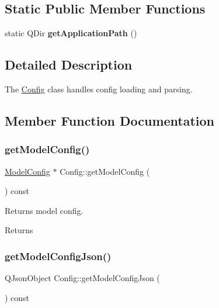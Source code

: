 \subsection*{Static Public Member Functions}
\begin{DoxyCompactItemize}
\item 
\mbox{\label{class_config_ad1d88d5265d60c785c30d69db00c5b9a}} 
static Q\+Dir {\bfseries get\+Application\+Path} ()
\end{DoxyCompactItemize}


\subsection{Detailed Description}
The \mbox{\hyperlink{class_config}{Config}} class handles config loading and parsing. 

\subsection{Member Function Documentation}
\mbox{\label{class_config_a1ff780b4fbdf6f7e432e11f2490c1b56}} 
\subsubsection{\texorpdfstring{get\+Model\+Config()}{getModelConfig()}}
{\footnotesize\ttfamily \mbox{\hyperlink{struct_model_config}{Model\+Config}} $\ast$ Config\+::get\+Model\+Config (\begin{DoxyParamCaption}{ }\end{DoxyParamCaption}) const}



Returns model config. 

\begin{DoxyReturn}{Returns}

\end{DoxyReturn}
\mbox{\label{class_config_a7a137547a3757056c6dea9f93945c417}} 
\subsubsection{\texorpdfstring{get\+Model\+Config\+Json()}{getModelConfigJson()}}
{\footnotesize\ttfamily Q\+Json\+Object Config\+::get\+Model\+Config\+Json (\begin{DoxyParamCaption}{ }\end{DoxyParamCaption}) const}



